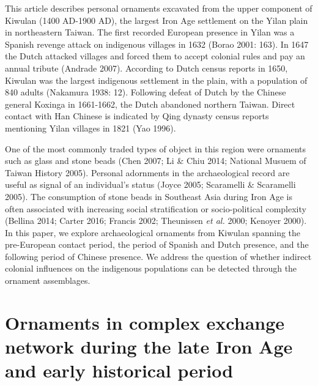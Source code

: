 \documentclass[]{article}
\begin{document}
This article describes personal ornaments excavated from the upper
component of Kiwulan (1400 AD-1900 AD), the largest Iron Age settlement
on the Yilan plain in northeastern Taiwan. The first recorded European
presence in Yilan was a Spanish revenge attack on indigenous villages in
1632 (Borao 2001: 163). In 1647 the Dutch attacked villages and forced
them to accept colonial rules and pay an annual tribute (Andrade 2007).
According to Dutch census reports in 1650, Kiwulan was the largest
indigenous settlement in the plain, with a population of 840 adults
(Nakamura 1938: 12). Following defeat of Dutch by the Chinese general
Koxinga in 1661-1662, the Dutch abandoned northern Taiwan. Direct
contact with Han Chinese is indicated by Qing dynasty census reports
mentioning Yilan villages in 1821 (Yao 1996).

One of the most commonly traded types of object in this region were
ornaments such as glass and stone beads (Chen 2007; Li \& Chiu 2014;
National Musuem of Taiwan History 2005). Personal adornments in the
archaeological record are useful as signal of an individual's status
(Joyce 2005; Scaramelli \& Scaramelli 2005). The consumption of stone
beads in Southeast Asia during Iron Age is often associated with
increasing social stratification or socio-political complexity (Bellina
2014; Carter 2016; Francis 2002; Theunissen \emph{et al.} 2000; Kenoyer
2000). In this paper, we explore archaeological ornaments from Kiwulan
spanning the pre-European contact period, the period of Spanish and
Dutch presence, and the following period of Chinese presence. We address
the question of whether indirect colonial influences on the indigenous
populations can be detected through the ornament assemblages.

\hypertarget{ornaments-in-complex-exchange-network-during-the-late-iron-age-and-early-historical-period}{%
\section{Ornaments in complex exchange network during the late Iron Age
and early historical
period}\label{ornaments-in-complex-exchange-network-during-the-late-iron-age-and-early-historical-period}}
\end{document}
